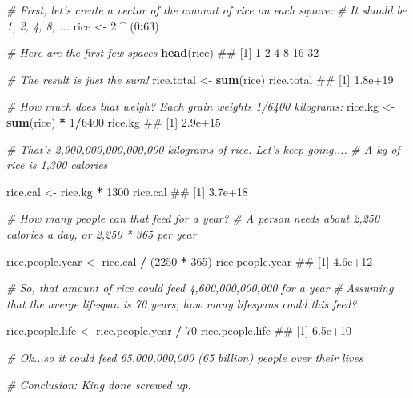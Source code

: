 \documentclass[]{book}
\newenvironment{Shaded}{\begin{snugshade}}{\end{snugshade}}
\newcommand{\KeywordTok}[1]{\textcolor[rgb]{0.13,0.29,0.53}{\textbf{#1}}}
\newcommand{\DecValTok}[1]{\textcolor[rgb]{0.00,0.00,0.81}{#1}}
\newcommand{\StringTok}[1]{\textcolor[rgb]{0.31,0.60,0.02}{#1}}
\newcommand{\CommentTok}[1]{\textcolor[rgb]{0.56,0.35,0.01}{\textit{#1}}}
\newcommand{\OperatorTok}[1]{\textcolor[rgb]{0.81,0.36,0.00}{\textbf{#1}}}
\newcommand{\NormalTok}[1]{#1}
\theoremstyle{definition}
\theoremstyle{definition}
\theoremstyle{remark}
\begin{document}
\begin{Shaded}
\begin{Highlighting}[]
\CommentTok{# First, let's create a vector of the amount of rice on each square:}
\CommentTok{# It should be 1, 2, 4, 8, ...}
\NormalTok{rice <-}\StringTok{ }\DecValTok{2} \OperatorTok{^}\StringTok{ }\NormalTok{(}\DecValTok{0}\OperatorTok{:}\DecValTok{63}\NormalTok{)}

\CommentTok{# Here are the first few spaces}
\KeywordTok{head}\NormalTok{(rice)}
\NormalTok{## [1]  1  2  4  8 16 32}

\CommentTok{# The result is just the sum!}
\NormalTok{rice.total <-}\StringTok{ }\KeywordTok{sum}\NormalTok{(rice)}
\NormalTok{rice.total}
\NormalTok{## [1] 1.8e+19}

\CommentTok{# How much does that weigh? Each grain weights 1/6400 kilograms:}
\NormalTok{rice.kg <-}\StringTok{ }\KeywordTok{sum}\NormalTok{(rice) }\OperatorTok{*}\StringTok{ }\DecValTok{1}\OperatorTok{/}\DecValTok{6400}
\NormalTok{rice.kg}
\NormalTok{## [1] 2.9e+15}

\CommentTok{# That's 2,900,000,000,000,000 kilograms of rice. Let's keep going....}
\CommentTok{# A kg of rice is 1,300 calories}

\NormalTok{rice.cal <-}\StringTok{ }\NormalTok{rice.kg }\OperatorTok{*}\StringTok{ }\DecValTok{1300}
\NormalTok{rice.cal}
\NormalTok{## [1] 3.7e+18}

\CommentTok{# How many people can that feed for a year?}
\CommentTok{# A person needs about 2,250 calories a day, or 2,250 * 365 per year}

\NormalTok{rice.people.year <-}\StringTok{ }\NormalTok{rice.cal }\OperatorTok{/}\StringTok{ }\NormalTok{(}\DecValTok{2250} \OperatorTok{*}\StringTok{ }\DecValTok{365}\NormalTok{)}
\NormalTok{rice.people.year}
\NormalTok{## [1] 4.6e+12}

\CommentTok{# So, that amount of rice could feed 4,600,000,000,000 for a year}
\CommentTok{# Assuming that the averge lifespan is 70 years, how many lifespans could this feed?}

\NormalTok{rice.people.life <-}\StringTok{ }\NormalTok{rice.people.year }\OperatorTok{/}\StringTok{ }\DecValTok{70}
\NormalTok{rice.people.life}
\NormalTok{## [1] 6.5e+10}

\CommentTok{# Ok...so it could feed 65,000,000,000 (65 billion) people over their lives}

\CommentTok{# Conclusion: King done screwed up.}
\end{Highlighting}
\end{Shaded}
\end{document}
